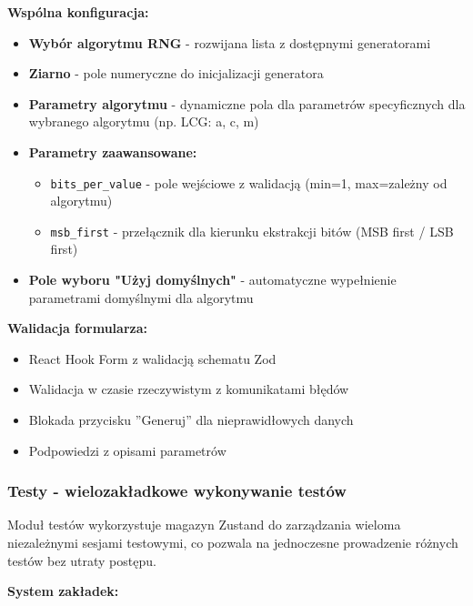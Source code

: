 \documentclass[12pt,a4paper]{article}
\begin{document}
\textbf{Wspólna konfiguracja:}
\begin{itemize}
    \item \textbf{Wybór algorytmu RNG} - rozwijana lista z dostępnymi generatorami
    \item \textbf{Ziarno} - pole numeryczne do inicjalizacji generatora
    \item \textbf{Parametry algorytmu} - dynamiczne pola dla parametrów specyficznych dla wybranego algorytmu (np. LCG: a, c, m)
    \item \textbf{Parametry zaawansowane:}
    \begin{itemize}
        \item \texttt{bits\_per\_value} - pole wejściowe z walidacją (min=1, max=zależny od algorytmu)
        \item \texttt{msb\_first} - przełącznik dla kierunku ekstrakcji bitów (MSB first / LSB first)
    \end{itemize}
    \item \textbf{Pole wyboru "Użyj domyślnych"} - automatyczne wypełnienie parametrami domyślnymi dla algorytmu
\end{itemize}

\textbf{Walidacja formularza:}
\begin{itemize}
    \item React Hook Form z walidacją schematu Zod
    \item Walidacja w czasie rzeczywistym z komunikatami błędów
    \item Blokada przycisku ''Generuj'' dla nieprawidłowych danych
    \item Podpowiedzi z opisami parametrów
\end{itemize}

\subsubsection{Testy - wielozakładkowe wykonywanie testów}

Moduł testów wykorzystuje magazyn Zustand do zarządzania wieloma niezależnymi sesjami testowymi, co pozwala na jednoczesne prowadzenie różnych testów bez utraty postępu.

\textbf{System zakładek:}
\end{document}
